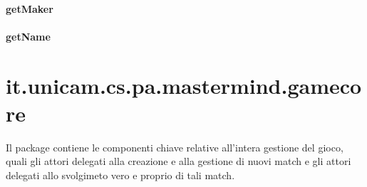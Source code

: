 \documentclass[letterpaper,10pt,italian,openany,oneside]{sphinxmanual}
\begin{document}
\begin{fulllineitems}
\label{\detokenize{source/it/unicam/cs/pa/mastermind/factories/RandomBotMakerFactory:it.unicam.cs.pa.mastermind.factories.RandomBotMakerFactory.getDescription()}}
\end{fulllineitems}



\paragraph{getMaker}
\label{\detokenize{source/it/unicam/cs/pa/mastermind/factories/RandomBotMakerFactory:getmaker}}

\begin{fulllineitems}
\label{\detokenize{source/it/unicam/cs/pa/mastermind/factories/RandomBotMakerFactory:it.unicam.cs.pa.mastermind.factories.RandomBotMakerFactory.getMaker(GameView, int, int)}}
\end{fulllineitems}



\paragraph{getName}
\label{\detokenize{source/it/unicam/cs/pa/mastermind/factories/RandomBotMakerFactory:getname}}

\begin{fulllineitems}
\label{\detokenize{source/it/unicam/cs/pa/mastermind/factories/RandomBotMakerFactory:it.unicam.cs.pa.mastermind.factories.RandomBotMakerFactory.getName()}}
\end{fulllineitems}



\section{it.unicam.cs.pa.mastermind.gamecore}
\label{\detokenize{source/it/unicam/cs/pa/mastermind/gamecore/package-index:it-unicam-cs-pa-mastermind-gamecore}}\label{\detokenize{source/it/unicam/cs/pa/mastermind/gamecore/package-index::doc}}
Il package contiene le componenti chiave relative all’intera gestione del gioco, quali gli attori delegati alla creazione e alla gestione di nuovi match e gli attori delegati allo svolgimeto vero e proprio di tali match.
\end{document}
